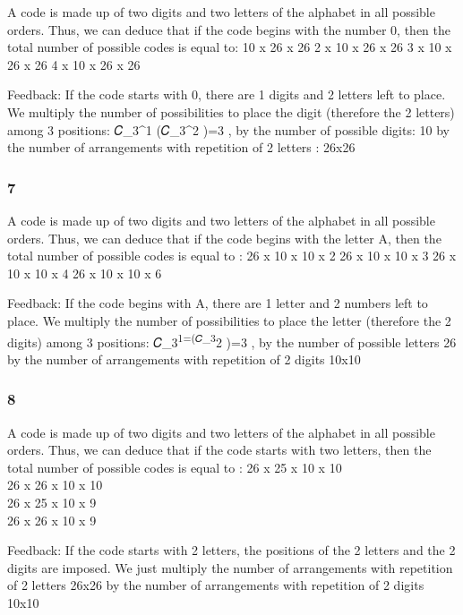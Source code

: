 \documentclass[
  letterpaper,
  DIV=11,
  numbers=noendperiod]{scrreprt}
\begin{document}
A code is made up of two digits and two letters of the alphabet in all
possible orders. Thus, we can deduce that if the code begins with the
number 0, then the total number of possible codes is equal to: 10 x 26 x
26 2 x 10 x 26 x 26 3 x 10 x 26 x 26 4 x 10 x 26 x 26

Feedback: If the code starts with 0, there are 1 digits and 2 letters
left to place. We multiply the number of possibilities to place the
digit (therefore the 2 letters) among 3 positions: 𝐶\_3\^{}1 (𝐶\_3\^{}2
)=3 , by the number of possible digits: 10 by the number of arrangements
with repetition of 2 letters : 26x26

\subsubsection{7}\label{section-6}

A code is made up of two digits and two letters of the alphabet in all
possible orders. Thus, we can deduce that if the code begins with the
letter A, then the total number of possible codes is equal to : 26 x 10
x 10 x 2 26 x 10 x 10 x 3 26 x 10 x 10 x 4 26 x 10 x 10 x 6

Feedback: If the code begins with A, there are 1 letter and 2 numbers
left to place. We multiply the number of possibilities to place the
letter (therefore the 2 digits) among 3 positions:
𝐶\_3\textsuperscript{1=(𝐶\_3}2 )=3 , by the number of possible letters
26 by the number of arrangements with repetition of 2 digits 10x10

\subsubsection{8}\label{section-7}

A code is made up of two digits and two letters of the alphabet in all
possible orders. Thus, we can deduce that if the code starts with two
letters, then the total number of possible codes is equal to : 26 x 25 x
10 x 10\\
26 x 26 x 10 x 10\\
26 x 25 x 10 x 9\\
26 x 26 x 10 x 9

Feedback: If the code starts with 2 letters, the positions of the 2
letters and the 2 digits are imposed. We just multiply the number of
arrangements with repetition of 2 letters 26x26 by the number of
arrangements with repetition of 2 digits 10x10

\end{document}
